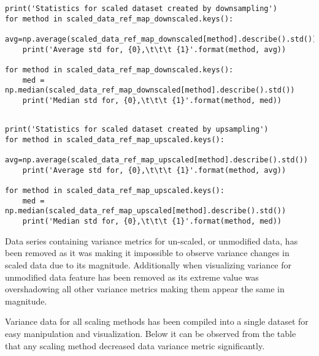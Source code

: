 \begin{code}
\label{code:scalers:getting-metrics-downsample}
\begin{verbatim}
print('Statistics for scaled dataset created by downsampling')
for method in scaled_data_ref_map_downscaled.keys():
    avg=np.average(scaled_data_ref_map_downscaled[method].describe().std())
    print('Average std for, {0},\t\t\t {1}'.format(method, avg))
    
for method in scaled_data_ref_map_downscaled.keys():
    med = np.median(scaled_data_ref_map_downscaled[method].describe().std())
    print('Median std for, {0},\t\t\t {1}'.format(method, med))
    \end{verbatim}
\end{code}

\begin{code}
\label{code:scalers:getting-metrics-upsample}
\begin{verbatim}

print('Statistics for scaled dataset created by upsampling')
for method in scaled_data_ref_map_upscaled.keys():
    avg=np.average(scaled_data_ref_map_upscaled[method].describe().std())
    print('Average std for, {0},\t\t\t {1}'.format(method, avg))
    
for method in scaled_data_ref_map_upscaled.keys():
    med = np.median(scaled_data_ref_map_upscaled[method].describe().std())
    print('Median std for, {0},\t\t\t {1}'.format(method, med))
        \end{verbatim}
\end{code}

Data series containing variance metrics for un-scaled, or unmodified data, has been removed as it was making it impossible to observe variance changes in scaled data due to its magnitude. Additionally when visualizing variance for unmodified data \fileAgeInSec{} feature has been removed as its extreme value was overshadowing all other variance metrics making them appear the same in magnitude.

Variance data for all scaling methods has been compiled into a single dataset for easy manipulation and visualization. Below it can be observed from the table that any scaling method decreased data variance metric significantly.
